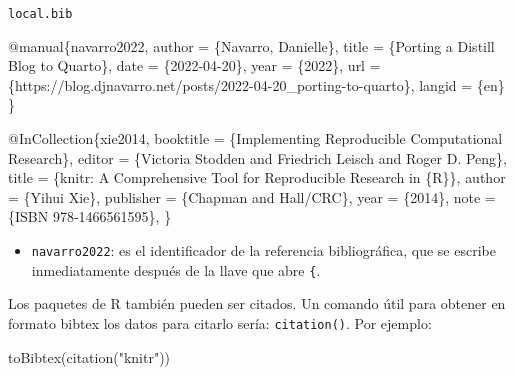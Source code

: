 \documentclass[
  11pt,
  a4paper,
  DIV=11,
  numbers=noendperiod]{scrartcl}
\newenvironment{Shaded}{\begin{snugshade}}{\end{snugshade}}
\newcommand{\DataTypeTok}[1]{\textcolor[rgb]{0.68,0.00,0.00}{#1}}
\newcommand{\FunctionTok}[1]{\textcolor[rgb]{0.28,0.35,0.67}{#1}}
\newcommand{\NormalTok}[1]{\textcolor[rgb]{0.00,0.23,0.31}{#1}}
\newcommand{\OtherTok}[1]{\textcolor[rgb]{0.00,0.23,0.31}{#1}}
\newcommand{\StringTok}[1]{\textcolor[rgb]{0.13,0.47,0.30}{#1}}
\newcommand{\VariableTok}[1]{\textcolor[rgb]{0.07,0.07,0.07}{#1}}
\providecommand{\tightlist}{%
  \setlength{\itemsep}{0pt}\setlength{\parskip}{0pt}}\usepackage{longtable,booktabs,array}
\theoremstyle{definition}
\theoremstyle{remark}
\begin{document}
\begin{codelisting}

\caption{\texttt{local.bib}}

\begin{Shaded}
\begin{Highlighting}[]
\VariableTok{@manual}\NormalTok{\{}\OtherTok{navarro2022}\NormalTok{,}
  \DataTypeTok{author}\NormalTok{ = \{Navarro, Danielle\},}
  \DataTypeTok{title}\NormalTok{ = \{Porting a Distill Blog to Quarto\},}
  \DataTypeTok{date}\NormalTok{ = \{2022{-}04{-}20\},}
  \DataTypeTok{year}\NormalTok{ = \{2022\},}
  \DataTypeTok{url}\NormalTok{ = \{https://blog.djnavarro.net/posts/2022{-}04{-}20\_porting{-}to{-}quarto\},}
  \DataTypeTok{langid}\NormalTok{ = \{en\}}
\NormalTok{\}}

\VariableTok{@InCollection}\NormalTok{\{}\OtherTok{xie2014}\NormalTok{,}
  \DataTypeTok{booktitle}\NormalTok{ = \{Implementing Reproducible Computational Research\},}
  \DataTypeTok{editor}\NormalTok{ = \{Victoria Stodden and Friedrich Leisch and Roger D. Peng\},}
  \DataTypeTok{title}\NormalTok{ = \{knitr: A Comprehensive Tool for Reproducible Research in \{R\}\},}
  \DataTypeTok{author}\NormalTok{ = \{Yihui Xie\},}
  \DataTypeTok{publisher}\NormalTok{ = \{Chapman and Hall/CRC\},}
  \DataTypeTok{year}\NormalTok{ = \{2014\},}
  \DataTypeTok{note}\NormalTok{ = \{ISBN 978{-}1466561595\},}
\NormalTok{\}}
\end{Highlighting}
\end{Shaded}

\end{codelisting}

\begin{itemize}
\tightlist
\item
  \texttt{navarro2022}: es el identificador de la referencia
  bibliográfica, que se escribe inmediatamente después de la llave que
  abre \texttt{\{}.
\end{itemize}

Los paquetes de R también pueden ser citados. Un comando útil para
obtener en formato bibtex los datos para citarlo sería:
\texttt{citation()}. Por ejemplo:

\begin{Shaded}
\begin{Highlighting}[]
\FunctionTok{toBibtex}\NormalTok{(}\FunctionTok{citation}\NormalTok{(}\StringTok{"knitr"}\NormalTok{))}
\end{Highlighting}
\end{Shaded}
\end{document}

